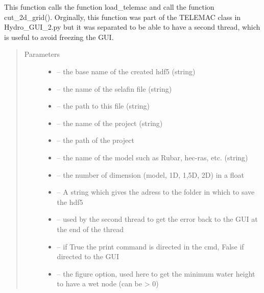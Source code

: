 \documentclass[letterpaper,10pt,english]{sphinxmanual}
\begin{document}
\begin{fulllineitems}
\label{\detokenize{index:src.selafin_habby1.load_telemac_and_cut_grid}}
This function calls the function load\_telemac and call the function cut\_2d\_grid(). Orginally, this function
was part of the TELEMAC class in Hydro\_GUI\_2.py but it was separated to be able to have a second thread, which
is useful to avoid freezing the GUI.
\begin{quote}\begin{description}
\item[{Parameters}] \leavevmode\begin{itemize}
\item {} 
 -- the base name of the created hdf5 (string)

\item {} 
 -- the name of the selafin file (string)

\item {} 
 -- the path to this file (string)

\item {} 
 -- the name of the project (string)

\item {} 
 -- the path of the project

\item {} 
 -- the name of the model such as Rubar, hec-ras, etc. (string)

\item {} 
 -- the number of dimension (model, 1D, 1,5D, 2D) in a float

\item {} 
 -- A string which gives the adress to the folder in which to save the hdf5

\item {} 
 -- used by the second thread to get the error back to the GUI at the end of the thread

\item {} 
 -- if True the print command is directed in the cmd, False if directed to the GUI

\item {} 
 -- the figure option, used here to get the minimum water height to have a wet node (can be \textgreater{} 0)

\end{itemize}

\end{description}\end{quote}

\end{fulllineitems}
\end{document}
